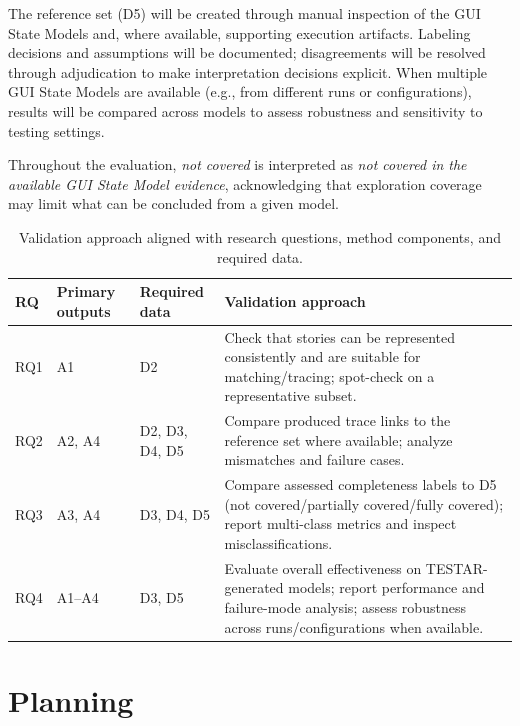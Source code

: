 \documentclass{ou-report-vaf}
\begin{document}
The reference set (D5) will be created through manual inspection of the GUI State Models and, where available, supporting execution artifacts. Labeling decisions and assumptions will be documented; disagreements will be resolved through adjudication to make interpretation decisions explicit. When multiple GUI State Models are available (e.g., from different runs or configurations), results will be compared across models to assess robustness and sensitivity to testing settings.

Throughout the evaluation, \emph{not covered} is interpreted as \emph{not covered in the available GUI State Model evidence}, acknowledging that exploration coverage may limit what can be concluded from a given model.

\begin{table}[h!tb]
    \centering
    \caption{Validation approach aligned with research questions, method components, and required data.}
    \label{tab:validation}
    \begin{tabular}{p{1.6cm}p{3.4cm}p{3.6cm}p{6.0cm}}
        \toprule
        \textbf{RQ} & \textbf{Primary outputs} & \textbf{Required data} & \textbf{Validation approach} \\
        \midrule
        RQ1 & A1 & D2 & Check that stories can be represented consistently and are suitable for matching/tracing; spot-check on a representative subset. \\
        RQ2 & A2, A4 & D2, D3, D4, D5 & Compare produced trace links to the reference set where available; analyze mismatches and failure cases. \\
        RQ3 & A3, A4 & D3, D4, D5 & Compare assessed completeness labels to D5 (not covered/partially covered/fully covered); report multi-class metrics and inspect misclassifications. \\
        RQ4 & A1--A4 & D3, D5 & Evaluate overall effectiveness on TESTAR-generated models; report performance and failure-mode analysis; assess robustness across runs/configurations when available. \\
        \bottomrule
    \end{tabular}
\end{table}

\clearpage
\section{Planning}
\label{sec:planning}
\end{document}

